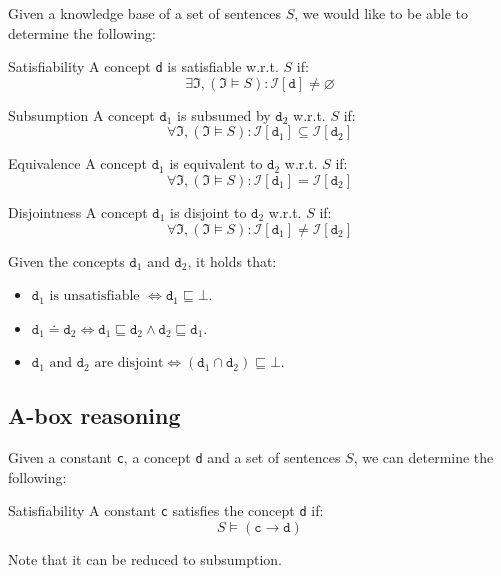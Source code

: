 Given a knowledge base of a set of sentences $S$, we would like to be able to determine the following:
\begin{descriptionlist}
    \item[Satisfiability] 
        A concept \texttt{d} is satisfiable w.r.t. $S$ if:
        \[ \exists \mathfrak{I}, (\mathfrak{I} \models S): \mathcal{I}[\texttt{d}] \neq \varnothing \]

    \item[Subsumption] 
        A concept $\texttt{d}_1$ is subsumed by $\texttt{d}_2$ w.r.t. $S$ if:
        \[ \forall \mathfrak{I}, (\mathfrak{I} \models S): \mathcal{I}[\texttt{d}_1] \subseteq \mathcal{I}[\texttt{d}_2] \]

    \item[Equivalence] 
        A concept $\texttt{d}_1$ is equivalent to $\texttt{d}_2$ w.r.t. $S$ if:
        \[ \forall \mathfrak{I}, (\mathfrak{I} \models S): \mathcal{I}[\texttt{d}_1] = \mathcal{I}[\texttt{d}_2] \]

    \item[Disjointness] 
        A concept $\texttt{d}_1$ is disjoint to $\texttt{d}_2$ w.r.t. $S$ if:
        \[ \forall \mathfrak{I}, (\mathfrak{I} \models S): \mathcal{I}[\texttt{d}_1] \neq \mathcal{I}[\texttt{d}_2] \]
\end{descriptionlist}

\begin{theorem}
    Given the concepts $\texttt{d}_1$ and $\texttt{d}_2$, it holds that:
    \begin{itemize}
        \item $\texttt{d}_1 \text{ is unsatisfiable } \iff \texttt{d}_1 \sqsubseteq \bot$.
        \item $\texttt{d}_1 \doteq \texttt{d}_2 \iff \texttt{d}_1 \sqsubseteq \texttt{d}_2 \land \texttt{d}_2 \sqsubseteq \texttt{d}_1$.
        \item $\texttt{d}_1 \text{ and } \texttt{d}_2 \text{ are disjoint} \iff (\texttt{d}_1 \cap \texttt{d}_2) \sqsubseteq \bot$.
    \end{itemize}
\end{theorem}

\subsection{A-box reasoning}
Given a constant \texttt{c}, a concept \texttt{d} and a set of sentences $S$, we can determine the following:
\begin{descriptionlist}
    \item[Satisfiability] 
        A constant \texttt{c} satisfies the concept \texttt{d} if:
        \[ S \models (\texttt{c} \rightarrow \texttt{d}) \]

        Note that it can be reduced to subsumption.
\end{descriptionlist}


